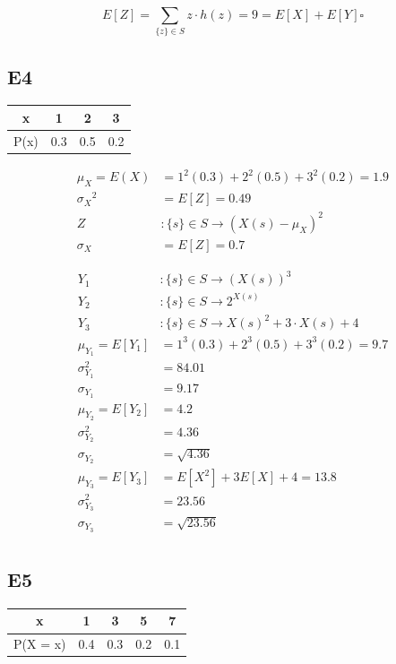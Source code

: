 \documentclass[12pt, a4paper]{article}
\begin{document}
$$
E[Z] = \sum_{ \{ z \} \in S}^{} z \cdot h(z) = 9 = E[X] + E[Y] \square
$$

\subsection* {E4}
\begin{table}[h]
\centering
\begin{tabular}{|c|c|c|c|}
\hline
x & 1 & 2 & 3 \\
\hline
P(x) & 0.3 & 0.5 & 0.2 \\
\hline
\end{tabular}
\end{table}


\begin{align*}
\mu_X = E(X) &= 1^2(0.3) + 2^2(0.5) + 3^2(0.2) = \boxed{ 1.9 } \\
	{\sigma_X}^2 &= E[Z] = \boxed{0.49 } \\
Z &: \{ s \} \in S \rightarrow ( X(s) - \mu_X ) ^ 2 \\
	\sigma_X &= E[Z] = \boxed{0.7} 
\end{align*}

\begin{align*}
Y_1 &: \{ s \} \in S \rightarrow ( X(s) ) ^ 3 \\
Y_2 &: \{ s \} \in S \rightarrow 2^{X(s)}  \\
Y_3 &: \{ s \} \in S \rightarrow  X(s)^2 + 3 \cdot X(s) + 4 \\
	\mu_{Y_1} = E[Y_1] &= 1^3(0.3) + 2^3(0.5) + 3^3(0.2) = \boxed{9.7}   \\
	\sigma_{Y_1}^2 &=  \boxed{84.01}\\  
	\sigma_{Y_1} &=  \boxed{9.17}\\
	\mu_{Y_2} = E[Y_2] &=  \boxed{4.2}\\
	\sigma_{Y_2}^2 &= \boxed{4.36}\\ 
	\sigma_{Y_2} &=  \boxed{\sqrt{4.36}}\\
	\mu_{Y_3} = E[Y_3] &=  E[X^2] + 3E[X] + 4 = \boxed{13.8} \\
	\sigma_{Y_3}^2 &=  \boxed{23.56}   \\
	\sigma_{Y_3} &=  \boxed{\sqrt{23.56}} \\
\end{align*}


\subsection* {E5}
\begin{table}[h]
\centering
\begin{tabular}{|c|c|c|c|c|}
\hline
x & 1 & 3 & 5 & 7 \\
\hline
P(X = x) & 0.4 & 0.3 & 0.2 & 0.1 \\
\hline
\end{tabular}
\end{table}
\end{document}
